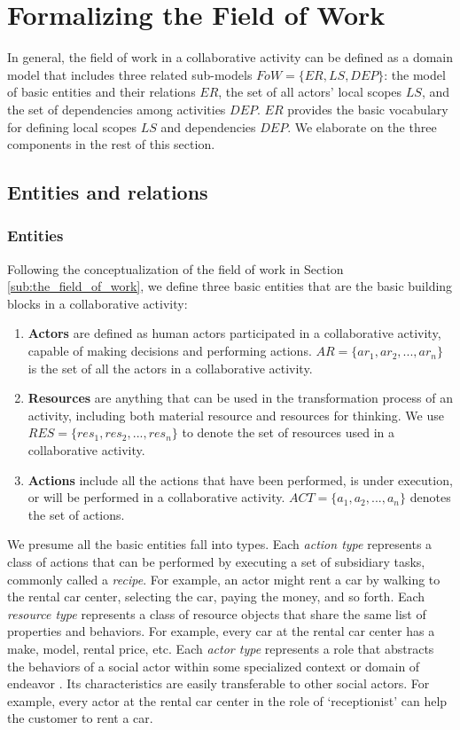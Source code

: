 \section{Formalizing the Field of Work} %
\label{sec:formalizaing_the_field_of_work}
In general, the field of work in a collaborative activity can be defined as a domain model that includes three related sub-models $FoW=\{ER, LS, DEP\}$: the model of basic entities and their relations $ER$, the set of all actors' local scopes $LS$, and the set of dependencies among activities $DEP$. $ER$ provides the basic vocabulary for defining local scopes $LS$ and dependencies $DEP$. We elaborate on the three components in the rest of this section. 

\subsection{Entities and relations} %
\label{sub:entities_relations}
\subsubsection{Entities} %
\label{ssub:entities}
Following the conceptualization of the field of work in Section \ref{sub:the_field_of_work}, 
we define three basic entities that are the basic building blocks in a collaborative activity:
\begin{enumerate}
    \item \textbf{Actors} are defined as human actors participated in a collaborative activity, capable of making decisions and performing actions. $AR=\{ar_1, ar_2, ..., ar_n\}$ is the set of all the actors in a collaborative activity.
    \item \textbf{Resources} are anything that can be used in the transformation process of an activity, including both material resource and resources for thinking. We use $RES=\{res_1, res_2, ..., res_n\}$ to denote the set of resources used in a collaborative activity.
	\item \textbf{Actions} include all the actions that have been performed, is under execution, or will be performed in a collaborative activity. $ACT=\{a_1, a_2, ..., a_n\}$ denotes the set of actions. 
\end{enumerate}

We presume all the basic entities fall into types. Each \emph{action type} represents a class of actions that can be performed by executing a set of subsidiary tasks, commonly called a \emph{recipe}. For example, an actor might rent a car by walking to the rental car center, selecting the car, paying the money, and so forth. Each \emph{resource type} represents a class of resource objects that share the same list of properties and behaviors. For example, every car at the rental car center has a make, model, rental price, etc. Each \emph{actor type} represents a role that abstracts the behaviors of a social actor within some specialized context or domain of endeavor \cite{Bresciani2004}. Its characteristics are easily transferable to other social actors. For example, every actor at the rental car center in the role of `receptionist' can help the customer to rent a car.

